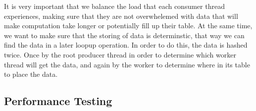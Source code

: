 \documentclass{article}
\begin{document}
It is very important that we balance the load that each consumer thread experiences, making sure that they are not overwhelemed with data that will make computation take longer or potentially fill up their table. At the same time, we want to make sure that the storing of data is determinstic, that way we can find the data in a later loopup operation. In order to do this, the data is hashed twice. Once by the root producer thread in order to determine which worker thread will get the data, and again by the worker to determine where in its table to place the data.



\subsection{Performance Testing}
\end{document}
